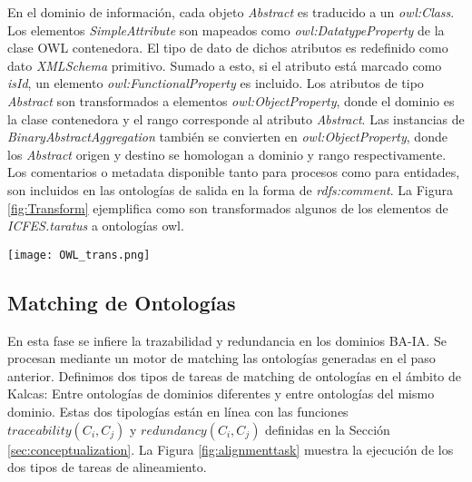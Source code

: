 En el dominio de informaci\'on, cada objeto \textit{Abstract} es traducido a un \textit{owl:Class}. Los elementos \textit{SimpleAttribute} son mapeados como \textit{owl:DatatypeProperty} de la clase OWL contenedora. El tipo de dato de dichos atributos es redefinido como dato \textit{XMLSchema} primitivo. Sumado a esto, si el atributo est\'a marcado como \textit{isId}, un elemento \textit{owl:FunctionalProperty} es incluido. Los atributos de tipo \textit{Abstract} son transformados a elementos \textit{owl:ObjectProperty}, donde el dominio es la clase contenedora y el rango corresponde al atributo \textit{Abstract}. Las instancias de \textit{BinaryAbstractAggregation} tambi\'en se convierten en \textit{owl:ObjectProperty}, donde los \textit{Abstract} origen y destino se homologan a dominio y rango respectivamente. Los comentarios o metadata disponible tanto para procesos como para entidades, son incluidos en las ontolog\'ias de salida en la forma de \textit{rdfs:comment}. La Figura \ref{fig:Transform} ejemplifica como son transformados algunos de los elementos de \textit{ICFES.taratus} a ontolog\'ias owl.

\begin{figure*}[!t]
\begin{center}
	\texttt{[image: OWL\_trans.png]}
	\caption{Ejemplo de Transformaci\'on Tartarus-OWL}
	\label{fig:Transform}
\end{center}	
\end{figure*}
\subsection{Matching de Ontolog\'ias} \label{sec:alignstep}
En esta fase se infiere la trazabilidad y redundancia en los dominios BA-IA. Se procesan mediante un motor de matching las ontolog\'ias generadas en el paso anterior. Definimos dos tipos de tareas de matching de ontolog\'ias en el \'ambito de Kalcas: Entre ontolog\'ias de dominios diferentes y entre ontolog\'ias del mismo dominio. Estas dos tipolog\'ias est\'an en l\'inea con las funciones $traceability(C_{i},C_{j})$ y $redundancy(C_{i},C_{j})$ definidas en la Secci\'on \ref{sec:conceptualization}. La Figura \ref{fig:alignmenttask} muestra la ejecuci\'on de los dos tipos de tareas de alineamiento.

